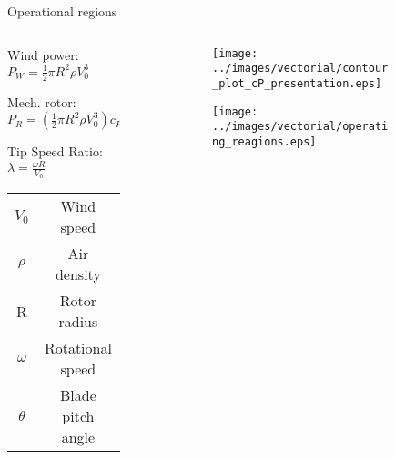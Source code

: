 \begin{frame}{Operational regions}

  \begin{columns}

    \begin{column}{0.4\columnwidth}
      \begin{myitemize}
        \item Wind power: $P_W = \frac{1}{2}\pi R^2 \rho V_0^3$
        \item Mech. rotor: $P_R = \left(\frac{1}{2}\pi R^2 \rho V_0^3\right) c_{P}$
        \item Tip Speed Ratio: $\lambda=\frac{\omega R}{V_0}$
      \end{myitemize}
     
     
      \begin{table}
        \begin{tabular}{cc}
          \toprule
          $V_0$ & Wind speed\\
          $\rho$ & Air density\\
          R & Rotor radius\\
          $\omega$ & Rotational speed\\
          $\theta$ & Blade pitch angle  \\        
          \bottomrule
        \end{tabular}
      \end{table}
    \end{column}

    \begin{column}{0.55\columnwidth}
      \begin{figure}
        \begin{subfigure}{0.85\columnwidth}
          \centering
          \texttt{[image: ../images/vectorial/contour\_plot\_cP\_presentation.eps]}
        \end{subfigure}
        \begin{subfigure}{0.85\columnwidth}
          \centering
          \texttt{[image: ../images/vectorial/operating\_reagions.eps]}
        \end{subfigure}
      \end{figure}
    \end{column}
    
  \end{columns}


\end{frame}
